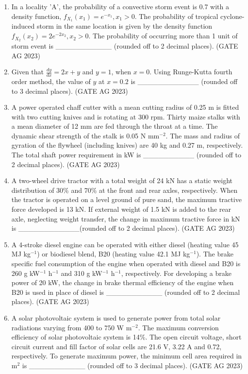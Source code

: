 \documentclass[journal,12pt,onecolumn]{IEEEtran}
\theoremstyle{remark}
\begin{document}
\begin{enumerate}
    \item In a locality 'A', the probability of a convective storm event is 0.7 with a density function, $f_{X_{1}}(x_{1}) = e^{-x_{1}}, x_{1} > 0$. The probability of tropical cyclone-induced storm in the same location is given by the density function $f_{X_{2}}(x_{2}) = 2e^{-2x_{2}}, x_{2} > 0$. The probability of occurring more than 1 unit of storm event is \_\_\_\_\_\_\_\_\_\_\_ (rounded off to 2 decimal places).
\hfill{(GATE AG 2023)}

    \item Given that $\frac{dy}{dx} = 2x+y$ and $y=1$, when $x=0$. Using Runge-Kutta fourth order method, the value of $y$ at $x=0.2$ is \_\_\_\_\_\_\_\_\_\_\_\_ (rounded off to 3 decimal places).
\hfill{(GATE AG 2023)}

\item A power operated chaff cutter with a mean cutting radius of 0.25 m is fitted with two cutting knives and is rotating at 300 rpm. Thirty maize stalks with a mean diameter of 12 mm are fed through the throat at a time. The dynamic shear strength of the stalk is 0.05 N mm$^{-2}$. The mass and radius of gyration of the flywheel (including knives) are 40 kg and 0.27 m, respectively. The total shaft power requirement in kW is \_\_\_\_\_\_\_\_\_\_ (rounded off to 2 decimal places).
\hfill{(GATE AG 2023)}

    \item A two-wheel drive tractor with a total weight of 24 kN has a static weight distribution of 30\% and 70\% at the front and rear axles, respectively. When the tractor is operated on a level ground of pure sand, the maximum tractive force developed is 13 kN. If external weight of 1.5 kN is added to the rear axle, neglecting weight transfer, the change in maximum tractive force in kN is \_\_\_\_\_\_\_\_\_\_\_\_(rounded off to 2 decimal places).
    \hfill{(GATE AG 2023)}

    \item A 4-stroke diesel engine can be operated with either diesel (heating value 45 MJ kg$^{-1}$) or biodiesel blend, B20 (heating value 42.1 MJ kg$^{-1}$). The brake specific fuel consumption of the engine when operated with diesel and B20 is 260 g kW$^{-1}$ h$^{-1}$ and 310 g kW$^{-1}$ h$^{-1}$, respectively. For developing a brake power of 20 kW, the change in brake thermal efficiency of the engine when B20 is used in place of diesel is \_\_\_\_\_\_\_\_\_\_\_ (rounded off to 2 decimal places).
    \hfill{(GATE AG 2023)}

    \item A solar photovoltaic system is used to generate power from total solar radiations varying from 400 to 750 W m$^{-2}$. The maximum conversion efficiency of solar photovoltaic system is 14\%. The open circuit voltage, short circuit current and fill factor of solar cells are 21.6 V, 3.22 A and 0.72, respectively. To generate maximum power, the minimum cell area required in m$^{2}$ is \_\_\_\_\_\_\_\_\_\_\_ (rounded off to 3 decimal places).
\hfill{(GATE AG 2023)}


\end{enumerate}
\end{document}

